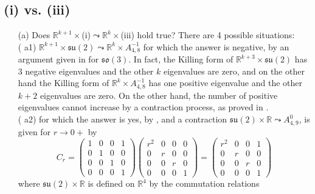 \documentclass[
reqno]{amsart}
\begin{document}
\subsection{(i) vs. (iii)}\label{Case2}\hfill
\begin{itemize}
\item[(a)] Does ${{\mathbb R}}^{k+1}\times$(i)${\leadsto}$${{\mathbb R}}^k\times$(iii) hold true?   
There are 4 possible situations: 
\\ ({{\bfseries\itshape} a1}) ${{\mathbb R}}^{k+1}\times{{\mathfrak s}{\mathfrak u}}(2){\leadsto}{{\mathbb R}}^k\times A_{4,8}^{-1}$ for which the answer is negative, 
by an argument given in \cite[Rem. 12]{NP06} for ${{\mathfrak s}{\mathfrak o}}(3)$. 
In fact, the Killing form of ${{\mathbb R}}^{k+3}\times{{\mathfrak s}{\mathfrak u}}(2)$ has 3 negative eigenvalues and the other $k$ eigenvalues are zero, 
and on the other hand the Killing form of ${{\mathbb R}}^k\times A_{4,8}^{-1}$ has one positive eigenvalue 
and the other $k+2$ eigenvalues are zero. 
On the other hand, the number of positive eigenvalues cannot increase by a contraction process, as proved in 
\cite[Th. 1(16)]{NP06}.
\\ ({{\bfseries\itshape} a2})  for which the answer is yes, by \cite[\S VIII.B]{NP06}, 
and a contraction ${{\mathfrak s}{\mathfrak u}}(2)\times{{\mathbb R}}{\leadsto} A_{4,9}^0$, 
is given for $r\to 0+$ by 
$$C_r
=\begin{pmatrix}
1 & 0 & 0 & 1 \\
0 & 1 & 0 & 0 \\
0 & 0 & 1 & 0 \\
0 & 0 & 0 & 1
\end{pmatrix}
\begin{pmatrix}
r^2 & 0 & 0 & 0 \\
0 & r & 0 & 0 \\
0 & 0 & r & 0 \\
0 & 0 & 0 & 1
\end{pmatrix}
=\begin{pmatrix}
r^2 & 0 & 0 & 1 \\
0 & r & 0 & 0 \\
0 & 0 & r & 0 \\
0 & 0 & 0 & 1
\end{pmatrix} $$
where ${{\mathfrak s}{\mathfrak u}}(2)\times{{\mathbb R}}$ is defined on ${{\mathbb R}}^4$ by the commutation relations 
\begin{equation}\label{su2}

\end{equation}$$
\end{itemize}
\end{document}
